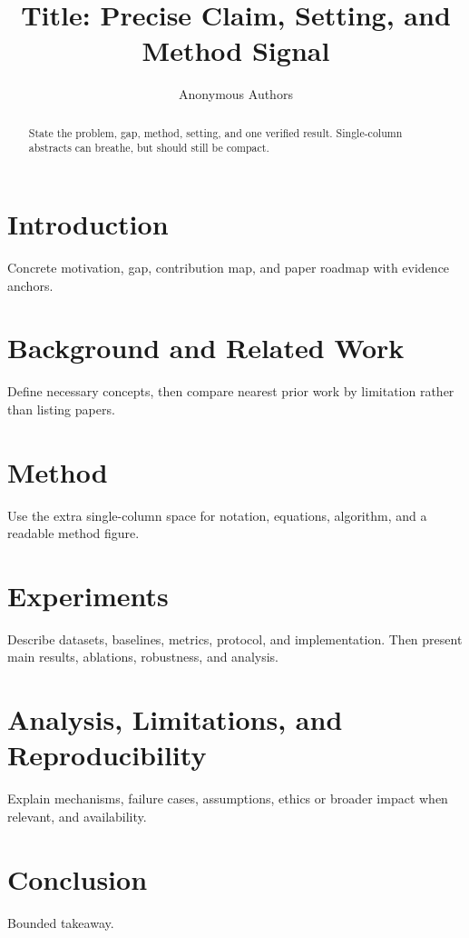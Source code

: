 \documentclass[11pt]{article}
\title{Title: Precise Claim, Setting, and Method Signal}
\author{Anonymous Authors}
\date{}
\begin{document}
\maketitle

\begin{abstract}
State the problem, gap, method, setting, and one verified result. Single-column abstracts can breathe, but should still be compact.
\end{abstract}

\section{Introduction}
Concrete motivation, gap, contribution map, and paper roadmap with evidence anchors.

\section{Background and Related Work}
Define necessary concepts, then compare nearest prior work by limitation rather than listing papers.

\section{Method}
Use the extra single-column space for notation, equations, algorithm, and a readable method figure.

\section{Experiments}
Describe datasets, baselines, metrics, protocol, and implementation. Then present main results, ablations, robustness, and analysis.

\section{Analysis, Limitations, and Reproducibility}
Explain mechanisms, failure cases, assumptions, ethics or broader impact when relevant, and availability.

\section{Conclusion}
Bounded takeaway.



\end{document}
